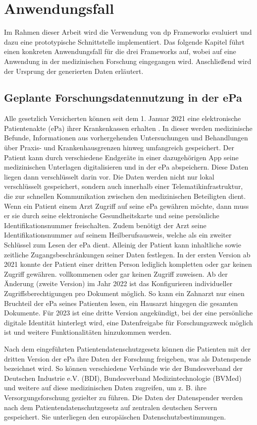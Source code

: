 \chapter{Anwendungsfall}
Im Rahmen dieser Arbeit wird die Verwendung von \gls{dp} Frameworks evaluiert und dazu eine prototypische Schnittstelle implementiert. Das folgende Kapitel führt einen konkreten Anwendungsfall für die drei Frameworks auf, wobei auf eine Anwendung in der medizinischen Forschung eingegangen wird. Anschließend wird der Ursprung der generierten Daten erläutert.
\section{Geplante Forschungsdatennutzung in der ePa}
Alle gesetzlich Versicherten können seit dem 1. Januar 2021 eine elektronische Patientenakte (\gls{ePa}) ihrer Krankenkassen erhalten \parencite{BGMePa}. In dieser werden medizinische Befunde, Informationen aus vorhergehenden Untersuchungen und Behandlungen über Praxis- und Krankenhausgrenzen hinweg umfangreich gespeichert. Der Patient kann durch verschiedene Endgeräte in einer dazugehörigen App seine medizinischen Unterlagen digitalisieren und in der \gls{ePa} abspeichern. Diese Daten liegen dann verschlüsselt darin vor. Die Daten werden nicht nur lokal verschlüsselt gespeichert, sondern auch innerhalb einer Telematikinfrastruktur, die zur schnellen Kommunikation zwischen den medizinischen Beteiligten dient.  Wenn ein Patient einem Arzt Zugriff auf seine \gls{ePa} gewähren möchte, dann muss er sie durch seine elektronische Gesundheitskarte und seine persönliche Identifikationsnummer freischalten. Zudem benötigt der Arzt seine Identifikationsnummer auf seinem Heilberufsausweis, welche als ein zweiter Schlüssel zum Lesen der \gls{ePa} dient. Alleinig der Patient kann inhaltliche sowie zeitliche Zugangsbeschränkungen seiner Daten festlegen. In der ersten Version ab 2021 konnte der Patient einer dritten Person lediglich kompletten oder gar keinen Zugriff gewähren. vollkommenen oder gar keinen Zugriff zuweisen. Ab der Änderung (zweite Version) im Jahr 2022 ist das Konfigurieren individueller Zugriffsberechtigungen pro Dokument möglich. So kann ein Zahnarzt nur einen Bruchteil der \gls{ePa} seines Patienten lesen, ein Hausarzt hingegen die gesamten Dokumente. Für 2023 ist eine dritte Version angekündigt, bei der eine persönliche digitale Identität hinterlegt wird, eine Datenfreigabe für Forschungszweck möglich ist und weitere Funktionalitäten hinzukommen werden.

Nach dem eingeführten Patientendatenschutzgesetz können die Patienten mit der dritten Version der \gls{ePa} ihre Daten der Forschung freigeben, was als Datenspende bezeichnet wird. So können verschiedene Verbände wie der Bundesverband der Deutschen Industrie e.V. (BDI), Bundesverband Medizintechnologie (BVMed) und weitere auf diese medizinischen Daten zugreifen, um z. B. ihre Versorgungsforschung gezielter zu führen. Die Daten der Datenspender werden nach dem Patientendatenschutzgesetz auf zentralen deutschen Servern gespeichert. Sie unterliegen den europäischen Datenschutzbestimmungen.

